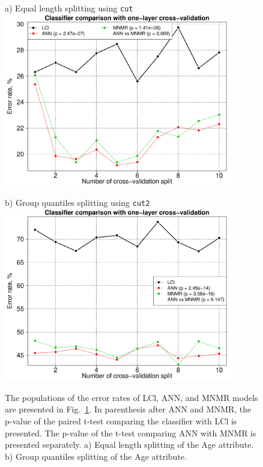\documentclass[10pt, paper=a4]{article}
\begin{document}
\begin{figure}[h!]
  \begin{minipage}{0.49\textwidth}
    a) Equal length splitting using \verb|cut|\\
    \includegraphics[width = 0.9\textwidth]{classifier_comparison_cut_1.pdf}
  \end{minipage} \hfill
  \begin{minipage}{0.49\textwidth}
    b) Group quantiles splitting using \verb|cut2|\\
    \includegraphics[width = 0.9\textwidth]{classifier_comparison_cut_2.pdf}
  \end{minipage} \vfill
  \caption{The populations of the error rates of LCl, ANN, and MNMR
    models are presented in Fig.~\ref{fig:comparison}.  In parenthesis
    after ANN and MNMR, the p-value of the paired t-test comparing the
    classifier with LCl is presented.  The p-value of the t-test
    comparing ANN with MNMR is presented separately. a) Equal length
    splitting of the Age attribute.  b) Group quantiles splitting of
    the Age attribute.}
  \label{fig:comparison}
\end{figure}
\end{document}
